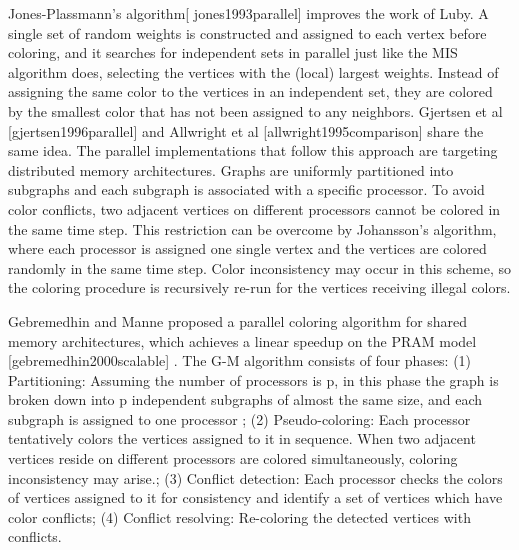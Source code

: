 \documentclass[preprint]{sigplanconf}
\begin{document}
Jones-Plassmann’s algorithm[ jones1993parallel]  improves the work of Luby. A single set of random weights is constructed and assigned to each vertex before coloring, and it searches for independent sets in parallel just like the MIS algorithm does, selecting the vertices with the (local) largest weights. Instead of assigning the same color to the vertices in an independent set, they are colored by the smallest color that has not been assigned to any neighbors. Gjertsen et al [gjertsen1996parallel] and Allwright et al [allwright1995comparison] share the same idea.  The parallel implementations that follow this approach are targeting distributed memory architectures.  Graphs are uniformly partitioned into subgraphs and each subgraph is associated with a specific processor.  To avoid color conflicts, two adjacent vertices on different processors cannot be colored in the same time step. This restriction can be overcome by Johansson’s algorithm, where each processor is assigned one single vertex and the vertices are colored randomly in the same time step. Color inconsistency may occur in this  scheme, so the coloring procedure is recursively re-run for the vertices receiving illegal colors.

Gebremedhin and Manne proposed a  parallel coloring algorithm for shared memory architectures, which achieves a linear speedup on the PRAM model [gebremedhin2000scalable] . The G-M algorithm consists of four phases: (1) Partitioning: Assuming the number of processors is p, in this phase the graph is broken down into p independent subgraphs of almost the same size, and each subgraph is assigned to one processor ; (2) Pseudo-coloring: Each processor tentatively colors the vertices assigned to it in sequence. When two adjacent vertices reside on different processors are colored simultaneously, coloring inconsistency may arise.; (3) Conflict detection:  Each processor checks the colors of  vertices assigned to it for consistency and identify a set of vertices which have color conflicts; (4) Conflict resolving: Re-coloring the detected vertices with conflicts.

\begin{algorithm}
\begin{algorithmic}
\
    {
    \ENDFOR
    \ENDFOR}
 
\ENDIF
\ENDFOR
\ENDFOR
{}
\end{algorithmic}
\end{algorithm}           
\end{document}
